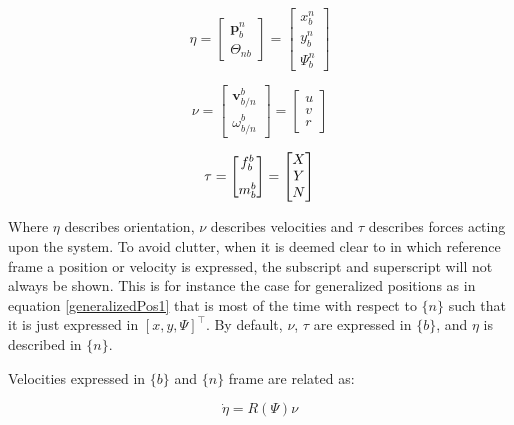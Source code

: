 \begin{equation}
	\eta = \begin{bmatrix} \textbf{p}^{n}_{b} \\[8pt]  \Theta_{nb} \end{bmatrix} = \begin{bmatrix} x^{n}_{b} \\[8pt]  y^{n}_{b} \\[8pt] \Psi^n_b \end{bmatrix}
	\label{generalizedPos1}
\end{equation}

\begin{equation}
	\nu = \begin{bmatrix} \textbf{v}^{b}_{b/n} \\[8pt]  \omega^{b}_{b/n} \end{bmatrix} = \begin{bmatrix} u\\v\\r \end{bmatrix}
	\label{generalizedVel1}
\end{equation}

\begin{equation}
	\tau = \begin{bmatrix} \boldmath{f}^{b}_{b} \\[8pt]  \boldmath{m}^{b}_{b} \end{bmatrix} = \begin{bmatrix} X \\ Y \\ N \end{bmatrix}
	\label{generalizedFor1}
\end{equation}

Where $\eta$ describes orientation, $\nu$ describes velocities and $\tau$ describes forces acting upon the system. 
To avoid clutter, when it is deemed clear to in which reference frame a position or velocity is expressed, the subscript and superscript will not always be shown. This is for instance the case for generalized positions as in equation \ref{generalizedPos1} that is most of the time with respect to $\{n\}$ such that it is just expressed in $ [x,y,\Psi]^\top$. By default, $ \nu$, $\tau$ are expressed in $\{b\}$, and $\eta$ is described in $\{n\}$.

Velocities expressed in $\{b\}$ and $\{n\}$ frame are related as:

\begin{equation}
\dot{\eta} = R(\Psi)\nu
\end{equation}

